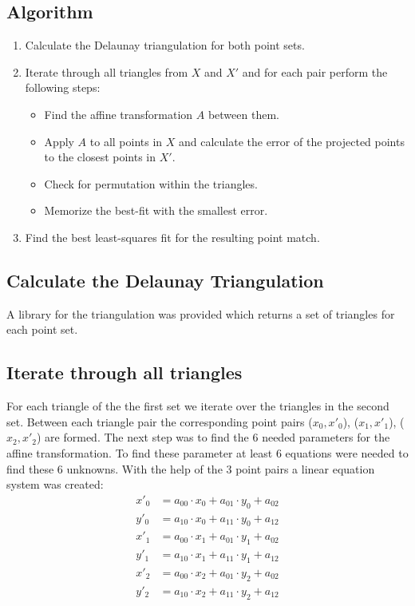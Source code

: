 \subsection{Algorithm}

\begin{enumerate}
	\item Calculate the Delaunay triangulation for both point sets.
	\item Iterate through all triangles  from $X$ and $X'$ and for each pair perform the following steps:
		\begin{itemize}
			\item Find the affine transformation $A$ between them.
			\item Apply $A$ to all points in $X$ and calculate the error of the projected points to the closest points in $X'$.
			\item Check for permutation within the triangles.
			\item Memorize the best-fit with the smallest error.
		\end{itemize}
	\item Find the best least-squares fit for the resulting point match.
\end{enumerate}

\subsection{Calculate the Delaunay Triangulation}

A library for the triangulation was provided which returns a set of triangles for each point set.

\subsection{Iterate through all triangles}

For each triangle of the the first set we iterate over the triangles in the second set. Between each triangle pair the corresponding point pairs ($x_0, x'_0$), ($x_1, x'_1$), ($x_2, x'_2$) are formed. The next step was to find the 6 needed parameters for the affine transformation. To find these parameter at least 6 equations were needed to find these 6 unknowns. With the help of the 3 point pairs a linear equation system was created:
\begin{align*}
	x'_0& = a_{00}\cdot x_0 + a_{01} \cdot y_0 + a_{02} \\
	y'_0& = a_{10}\cdot x_0 + a_{11} \cdot y_0 + a_{12} \\
	x'_1& = a_{00}\cdot x_1 + a_{01} \cdot y_1 + a_{02} \\
	y'_1& = a_{10}\cdot x_1 + a_{11} \cdot y_1 + a_{12} \\
	x'_2& = a_{00}\cdot x_2 + a_{01} \cdot y_2 + a_{02} \\
	y'_2& = a_{10}\cdot x_2 + a_{11} \cdot y_2 + a_{12} \\
\end{align*}

